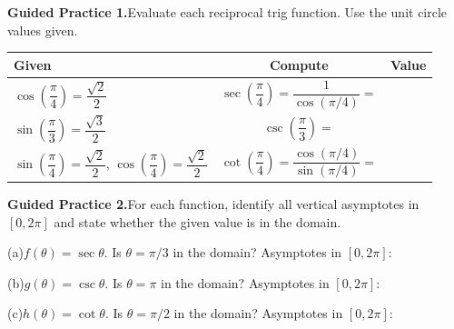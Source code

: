 \documentclass[10pt]{article}
\begin{document}
\begin{practicebox}

\textbf{Guided Practice 1.}\quad Evaluate each reciprocal trig function.
Use the unit circle values given.

\vspace{4pt}
\renewcommand{\arraystretch}{1.7}
\begin{tabular}{|l|c|c|}
\hline
\textbf{Given} & \textbf{Compute} & \textbf{Value} \\
\hline
$\cos\!\left(\dfrac{\pi}{4}\right) = \dfrac{\sqrt{2}}{2}$ &
$\sec\!\left(\dfrac{\pi}{4}\right) = \dfrac{1}{\cos(\pi/4)} = $ & \\
\hline
$\sin\!\left(\dfrac{\pi}{3}\right) = \dfrac{\sqrt{3}}{2}$ &
$\csc\!\left(\dfrac{\pi}{3}\right) = $ & \\
\hline
$\sin\!\left(\dfrac{\pi}{4}\right) = \dfrac{\sqrt{2}}{2}$, $\cos\!\left(\dfrac{\pi}{4}\right) = \dfrac{\sqrt{2}}{2}$ &
$\cot\!\left(\dfrac{\pi}{4}\right) = \dfrac{\cos(\pi/4)}{\sin(\pi/4)} = $ & \\
\hline
\end{tabular}

\vspace{0.10in}
\textbf{Guided Practice 2.}\quad For each function, identify all vertical asymptotes
in $[0, 2\pi]$ and state whether the given value is in the domain.

\vspace{4pt}
(a)\quad $f(\theta) = \sec\theta$. \quad Is $\theta = \pi/3$ in the domain?
\underline{\hspace{1.5cm}} \quad Asymptotes in $[0,2\pi]$: \underline{\hspace{4cm}}

\vspace{6pt}
(b)\quad $g(\theta) = \csc\theta$. \quad Is $\theta = \pi$ in the domain?
\underline{\hspace{1.5cm}} \quad Asymptotes in $[0,2\pi]$: \underline{\hspace{4cm}}

\vspace{6pt}
(c)\quad $h(\theta) = \cot\theta$. \quad Is $\theta = \pi/2$ in the domain?
\underline{\hspace{1.5cm}} \quad Asymptotes in $[0,2\pi]$: \underline{\hspace{4cm}}

\end{practicebox}
\end{document}
